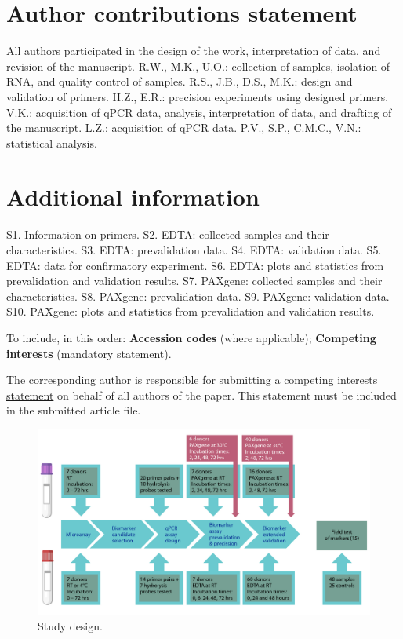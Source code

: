 \documentclass[fleqn,10pt]{wlscirep}
\begin{document}
\section*{Author contributions statement}

All authors participated in the design of the work, interpretation of data, and revision of the manuscript. R.W., M.K., U.O.: collection of samples, isolation of RNA, and quality control of samples. R.S., J.B., D.S., M.K.: design and validation of primers. H.Z., E.R.: precision experiments using designed primers. V.K.: acquisition of qPCR data, analysis, interpretation of data, and drafting of the manuscript. L.Z.: acquisition of qPCR data. P.V., S.P., C.M.C., V.N.: statistical analysis.

\section*{Additional information}

S1. Information on primers.
S2. EDTA: collected samples and their characteristics.
S3. EDTA: prevalidation data.
S4. EDTA: validation data.
S5. EDTA: data for confirmatory experiment.
S6. EDTA: plots and statistics from prevalidation and validation results.
S7. PAXgene: collected samples and their characteristics.
S8. PAXgene: prevalidation data.
S9. PAXgene: validation data.
S10. PAXgene: plots and statistics from prevalidation and validation results.

To include, in this order: \textbf{Accession codes} (where applicable); \textbf{Competing interests} (mandatory statement). 

The corresponding author is responsible for submitting a \href{http://www.nature.com/srep/policies/index.html#competing}{competing interests statement} on behalf of all authors of the paper. This statement must be included in the submitted article file.

\begin{figure}[ht]
\centering
\includegraphics[width=\linewidth]{figure1}
\caption{Study design.}
\label{fig:figure1}
\end{figure}
\end{document}
